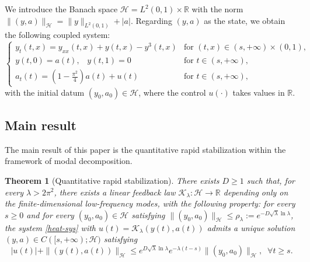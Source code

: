 \documentclass[a4paper]{article}
\newtheorem{theorem}{Theorem}[section]
\numberwithin{equation}{section}
\begin{document}
We introduce the Banach space $\mathcal{H}=L^2(0,1)\times \mathbb{R}$ with the norm $\|(y,a)\|_{\mathcal{H}}=\|y\|_{L^2(0,1)}+|a|$. Regarding $(y,a)$ as the state, we obtain the following coupled system:
\begin{equation}\label{heat-sys}
\left\{\begin{array}{ll}
 y_t(t,x) = y_{xx}( t,x)+y(t,x)-y^3( t,x)&\text{for }(t,x)\in(s,+\infty)  \times (0,1),\\[2mm]
y(t,0)=a(t),\;\;\;y(t,1)=0&\text{for }t\in(s,+\infty) ,\\[2mm]
a_t(t)=(1-\frac{\pi^2}{4})a(t)+u(t)&\text{for }t\in(s,+\infty),
\end{array}\right.
\end{equation}
with the initial datum $(y_0,a_0)\in \mathcal H$, where the control $u(\cdot)$ takes values in $\mathbb{R}$.

\subsection{Main result}
The main result of this paper is the quantitative rapid stabilization within the framework of modal decomposition.
 \begin{theorem}[Quantitative rapid stabilization]\label{qu-ra-sta}
There exists $D\ge1$ such that, for every $\lambda>2\pi^2$, there exists a linear feedback law $\mathcal{K}_{\lambda}:\mathcal{H}\to\mathbb{R}$ depending only on the finite-dimensional low-frequency modes, with the following property: for every $s\ge 0$ and for every $(y_0,a_0)\in \mathcal{H}$ satisfying $\|(y_0,a_0)\|_{\mathcal{H}}\le \rho_{\lambda}:=e^{-D\sqrt{\lambda}\ln\lambda}$, the system \eqref{heat-sys} with $u(t)=\mathcal{K}_{\lambda}(y(t),a(t))$ admits a unique solution $(y,a)\in C([s,+\infty);\mathcal{H})$ satisfying 
\begin{equation}\label{exp-s-heat}
|u(t)|+  \|(y(t),a(t))\|_{\mathcal{H}}\le e^{D\sqrt{\lambda}\ln\lambda}e^{-\lambda (t-s)}\|(y_0,a_0)\|_{\mathcal{H}},\;\;\forall t\ge s.
\end{equation}
\end{theorem}
\end{document}
